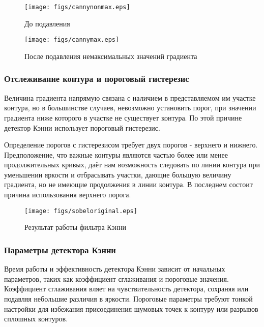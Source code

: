 \documentclass[a4paper,12pt]{report}
\begin{document}
\begin{figure}[!h]
\begin{center}\texttt{[image: figs/cannynonmax.eps]}
\end{center}
\caption{До подавления}
\label{cannynonmax}
\end{figure}
\begin{figure}[!h]
\begin{center}
\texttt{[image: figs/cannymax.eps]}
\end{center}
\caption{После подавления немаксимальных значений градиента}
\label{cannymax}
\end{figure}

\subsubsection{Отслеживание контура и пороговый гистерезис}
Величина градиента напрямую связана с наличием в представляемом им участке контура, но в большинстве случаев, невозможно установить порог, при значении градиента ниже которого в участке не существует контура. По этой причине детектор Кэнни использует пороговый гистерезис.

Определение порогов с гистерезисом требует двух порогов - верхнего и нижнего. Предположение, что важные контуры являются частью более или менее продолжительных кривых, даёт нам возможность следовать по линии контура при уменьшении яркости и отбрасывать участки, дающие большую величину градиента, но не имеющие продолжения в линии контура. В последнем состоит причина использования верхнего порога.

\begin{figure}[!h]
\begin{center}\texttt{[image: figs/sobeloriginal.eps]}
\end{center}
\caption{Результат работы фильтра Кэнни}
\label{cannyresult}
\end{figure}

\subsubsection{Параметры детектора Кэнни}
Время работы и эффективность детектора Кэнни зависит от начальных параметров, таких как коэффициент сглаживания и пороговые значения. Коэффициент сглаживания вляет на чувствительность детектора, сохраняя или подавляя небольшие различия в яркости. Пороговые параметры требуют тонкой настройки для избежания присоединения шумовых точек к контуру или разрывов сплошных контуров.
\end{document}
